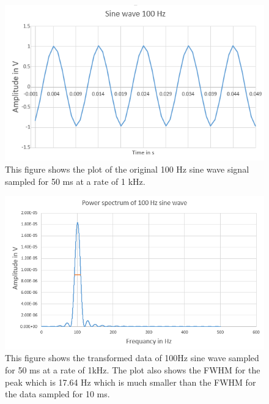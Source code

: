 \documentclass{article}
\begin{document}
\begin{figure}[H]
\includegraphics[scale=.75,center]{Sine50msex.PNG}
\caption{This figure shows the plot of the original 100 Hz sine wave signal sampled for 50 ms at a rate of 1 kHz.}
\end{figure}

\begin{figure}[H]
\includegraphics[scale=0.75,center]{Fouriersine50ms.PNG}
\caption{This figure shows the transformed data of 100Hz sine wave sampled for 50 ms at a rate of 1kHz.  The plot also shows the FWHM for the peak which is 17.64 Hz which is much smaller than the FWHM for the data sampled for 10 ms.  }
\end{figure}

\newpage
\end{document}
